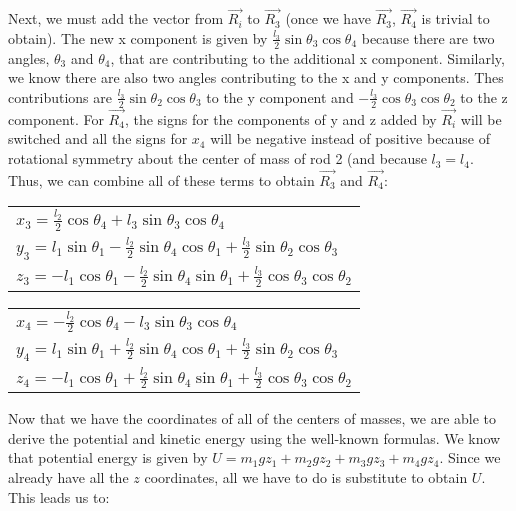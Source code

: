 \documentclass[12pt]{article}
\begin{document}
Next, we must add the vector from $\vec{R_i}$ to $\vec{R_3}$ (once we have $\vec{R_3}$, $\vec{R_4}$ is trivial to obtain). The new x component is given by $\frac{l_3}{2} \sin \theta_3 \cos \theta_4$ because there are two angles, $\theta_3$ and $\theta_4$, that are contributing to the additional x component. Similarly, we know there are also two angles contributing to the x and y components. Thes contributions are $\frac{l_3}{2} \sin \theta_2 \cos \theta_3 $ to the y component and $ - \frac{l_3}{2} \cos \theta_3 \cos \theta_2 $ to the z component. For $\vec{R_4}$, the signs for the components of y and z added by $\vec{R_i}$ will be switched and all the signs for $x_4$ will be negative instead of positive because of rotational symmetry about the center of mass of rod 2 (and because $l_3 = l_4$. Thus, we can combine all of these terms to obtain $\vec{R_3}$ and $\vec{R_4}$:

\begin{center}
\begin{tabular} {l}
$x_3 = \frac{l_2}{2} \cos \theta_4 + l_3 \sin \theta_3 \cos \theta_4$ \\
$y_3 = l_1 \sin \theta_1 - \frac{l_2}{2} \sin \theta_4 \cos \theta_1 + \frac{l_3}{2} \sin \theta_2 \cos \theta_3$  \\
$z_3 = - l_1 \cos \theta_1 -\frac{l_2}{2} \sin \theta_4 \sin \theta_1 + \frac{l_3}{2} \cos \theta_3 \cos \theta_2$ \\
\end{tabular}
\end{center}

\begin{center}
\begin{tabular}{l}
$x_4 = - \frac{l_2}{2} \cos \theta_4 - l_3 \sin \theta_3 \cos \theta_4$ \\
$ y_4 = l_1 \sin \theta_1 + \frac{l_2}{2} \sin \theta_4 \cos \theta_1 + \frac{l_3}{2} \sin \theta_2 \cos \theta_3 $ \\
$z_4 = - l_1 \cos \theta_1 + \frac{l_2}{2} \sin \theta_4 \sin \theta_1 + \frac{l_3}{2} \cos \theta_3 \cos \theta_2$ \\
\end{tabular}
\end{center}

Now that we have the coordinates of all of the centers of masses, we are able to derive the potential and kinetic energy using the well-known formulas. We know that potential energy is given by $ U = m_1 g z_1 + m_2 g z_2 + m_3 g z_3 +m_4 g z_4$. Since we already have all the $z$ coordinates, all we have to do is substitute to obtain $U$. This leads us to:
\end{document}
